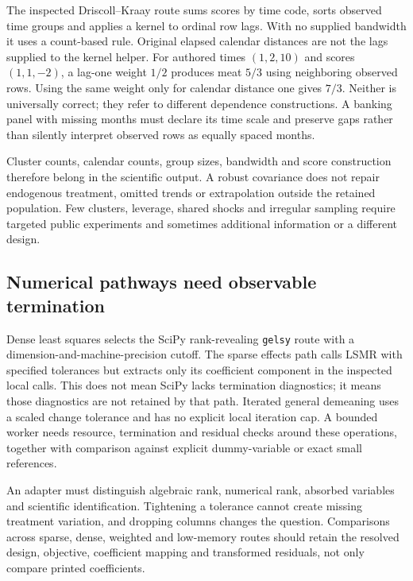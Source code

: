 The inspected Driscoll--Kraay route sums scores by time code, sorts observed
time groups and applies a kernel to ordinal row lags. With no supplied
bandwidth it uses a count-based rule. Original elapsed calendar distances
are not the lags supplied to the kernel helper. For authored times
$(1,2,10)$ and scores $(1,1,-2)$, a lag-one weight $1/2$ produces meat
$5/3$ using neighboring observed rows. Using the same weight only for
calendar distance one gives $7/3$. Neither is universally correct; they
refer to different dependence constructions. A banking panel with missing
months must declare its time scale and preserve gaps rather than silently
interpret observed rows as equally spaced months.
\citep{exec24_lmpanel_source,exec24_lmpanel_reference}

Cluster counts, calendar counts, group sizes, bandwidth and score construction
therefore belong in the scientific output. A robust covariance does not
repair endogenous treatment, omitted trends or extrapolation outside the
retained population. Few clusters, leverage, shared shocks and irregular
sampling require targeted public experiments and sometimes additional
information or a different design.~\citep{exec24_lmpanel_reference}

\subsection{Numerical pathways need observable termination}
Dense least squares selects the SciPy rank-revealing \texttt{gelsy} route
with a dimension-and-machine-precision cutoff. The sparse effects path
calls LSMR with specified tolerances but extracts only its coefficient
component in the inspected local calls. This does not mean SciPy lacks
termination diagnostics; it means those diagnostics are not retained by
that path. Iterated general demeaning uses a scaled change tolerance and
has no explicit local iteration cap. A bounded worker needs resource,
termination and residual checks around these operations, together with
comparison against explicit dummy-variable or exact small references.
\citep{exec24_lmpanel_source}

An adapter must distinguish algebraic rank, numerical rank, absorbed
variables and scientific identification. Tightening a tolerance cannot
create missing treatment variation, and dropping columns changes the
question. Comparisons across sparse, dense, weighted and low-memory routes
should retain the resolved design, objective, coefficient mapping and
transformed residuals, not only compare printed coefficients.
\citep{exec24_lmpanel_reference}

